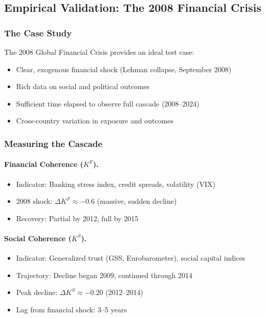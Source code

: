 \subsection{Empirical Validation: The 2008 Financial Crisis}

\subsubsection{The Case Study}

The 2008 Global Financial Crisis provides an ideal test case:
\begin{itemize}
    \item Clear, exogenous financial shock (Lehman collapse, September 2008)
    \item Rich data on social and political outcomes
    \item Sufficient time elapsed to observe full cascade (2008--2024)
    \item Cross-country variation in exposure and outcomes
\end{itemize}

\subsubsection{Measuring the Cascade}

\paragraph{Financial Coherence ($K^F$).}
\begin{itemize}
    \item Indicator: Banking stress index, credit spreads, volatility (VIX)
    \item 2008 shock: $\Delta K^F \approx -0.6$ (massive, sudden decline)
    \item Recovery: Partial by 2012, full by 2015
\end{itemize}

\paragraph{Social Coherence ($K^S$).}
\begin{itemize}
    \item Indicator: Generalized trust (GSS, Eurobarometer), social capital indices
    \item Trajectory: Decline began 2009, continued through 2014
    \item Peak decline: $\Delta K^S \approx -0.20$ (2012--2014)
    \item Lag from financial shock: 3--5 years
\end{itemize}

